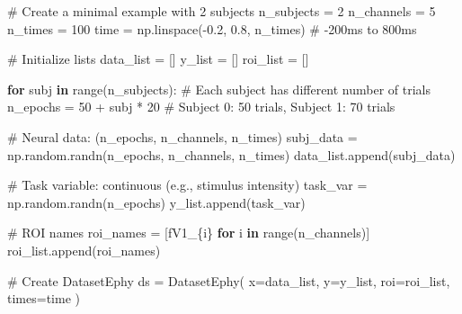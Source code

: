\documentclass[
  11pt,
  letterpaper,
  oneside,
  openany]{book}
\newenvironment{Shaded}{\begin{snugshade}}{\end{snugshade}}
\newcommand{\BuiltInTok}[1]{\textcolor[rgb]{0.00,0.23,0.31}{#1}}
\newcommand{\CommentTok}[1]{\textcolor[rgb]{0.37,0.37,0.37}{#1}}
\newcommand{\ControlFlowTok}[1]{\textcolor[rgb]{0.00,0.23,0.31}{\textbf{#1}}}
\newcommand{\DecValTok}[1]{\textcolor[rgb]{0.68,0.00,0.00}{#1}}
\newcommand{\FloatTok}[1]{\textcolor[rgb]{0.68,0.00,0.00}{#1}}
\newcommand{\KeywordTok}[1]{\textcolor[rgb]{0.00,0.23,0.31}{\textbf{#1}}}
\newcommand{\NormalTok}[1]{\textcolor[rgb]{0.00,0.23,0.31}{#1}}
\newcommand{\OperatorTok}[1]{\textcolor[rgb]{0.37,0.37,0.37}{#1}}
\newcommand{\SpecialCharTok}[1]{\textcolor[rgb]{0.37,0.37,0.37}{#1}}
\newcommand{\SpecialStringTok}[1]{\textcolor[rgb]{0.13,0.47,0.30}{#1}}
\begin{document}
\begin{Shaded}
\begin{Highlighting}[]
\CommentTok{\# Create a minimal example with 2 subjects}
\NormalTok{n\_subjects }\OperatorTok{=} \DecValTok{2}
\NormalTok{n\_channels }\OperatorTok{=} \DecValTok{5}
\NormalTok{n\_times }\OperatorTok{=} \DecValTok{100}
\NormalTok{time }\OperatorTok{=}\NormalTok{ np.linspace(}\OperatorTok{{-}}\FloatTok{0.2}\NormalTok{, }\FloatTok{0.8}\NormalTok{, n\_times)  }\CommentTok{\# {-}200ms to 800ms}

\CommentTok{\# Initialize lists}
\NormalTok{data\_list }\OperatorTok{=}\NormalTok{ []}
\NormalTok{y\_list }\OperatorTok{=}\NormalTok{ []}
\NormalTok{roi\_list }\OperatorTok{=}\NormalTok{ []}

\ControlFlowTok{for}\NormalTok{ subj }\KeywordTok{in} \BuiltInTok{range}\NormalTok{(n\_subjects):}
    \CommentTok{\# Each subject has different number of trials}
\NormalTok{    n\_epochs }\OperatorTok{=} \DecValTok{50} \OperatorTok{+}\NormalTok{ subj }\OperatorTok{*} \DecValTok{20}  \CommentTok{\# Subject 0: 50 trials, Subject 1: 70 trials}
    
    \CommentTok{\# Neural data: (n\_epochs, n\_channels, n\_times)}
\NormalTok{    subj\_data }\OperatorTok{=}\NormalTok{ np.random.randn(n\_epochs, n\_channels, n\_times)}
\NormalTok{    data\_list.append(subj\_data)}
    
    \CommentTok{\# Task variable: continuous (e.g., stimulus intensity)}
\NormalTok{    task\_var }\OperatorTok{=}\NormalTok{ np.random.randn(n\_epochs)}
\NormalTok{    y\_list.append(task\_var)}
    
    \CommentTok{\# ROI names}
\NormalTok{    roi\_names }\OperatorTok{=}\NormalTok{ [}\SpecialStringTok{f\textquotesingle{}V1\_}\SpecialCharTok{\{}\NormalTok{i}\SpecialCharTok{\}}\SpecialStringTok{\textquotesingle{}} \ControlFlowTok{for}\NormalTok{ i }\KeywordTok{in} \BuiltInTok{range}\NormalTok{(n\_channels)]}
\NormalTok{    roi\_list.append(roi\_names)}

\CommentTok{\# Create DatasetEphy}
\NormalTok{ds }\OperatorTok{=}\NormalTok{ DatasetEphy(}
\NormalTok{    x}\OperatorTok{=}\NormalTok{data\_list,}
\NormalTok{    y}\OperatorTok{=}\NormalTok{y\_list,}
\NormalTok{    roi}\OperatorTok{=}\NormalTok{roi\_list,}
\NormalTok{    times}\OperatorTok{=}\NormalTok{time}
\NormalTok{)}


\end{Highlighting}
\end{Shaded}
\end{document}
